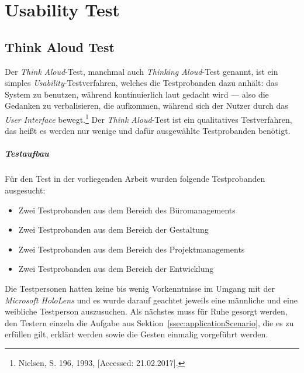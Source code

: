 \chapter{Usability Test}\label{chapter:UsabilityTest}
\section{Think Aloud Test}\label{sec:ThinkAloudTest} 
Der \textit{Think Aloud}-Test, manchmal auch \textit{Thinking Aloud}-Test genannt, ist ein simples \textit{Usability}-Testverfahren, welches die Testprobanden dazu anhält: \frqq das System zu benutzen, während kontinuierlich laut gedacht wird — also die Gedanken zu verbalisieren, die aufkommen, während sich der Nutzer durch das \textit{User Interface} bewegt.\flqq\footnote{Nielsen, S. 196, 1993, [Accessed: 21.02.2017].}
Der \textit{Think Aloud}-Test ist ein qualitatives Testverfahren, das heißt es werden nur wenige und dafür ausgewählte Testprobanden benötigt.
\paragraph*{Testaufbau}Für den Test in der vorliegenden Arbeit wurden folgende Testprobanden ausgesucht:\begin{itemize}
	\item Zwei Testprobanden aus dem Bereich des Büromanagements
	\item Zwei Testprobanden aus dem Bereich der Gestaltung
	\item Zwei Testprobanden aus dem Bereich des Projektmanagements
	\item Zwei Testprobanden aus dem Bereich der Entwicklung
\end{itemize}
Die Testpersonen hatten keine bis wenig Vorkenntnisse im Umgang mit der \textit{Microsoft HoloLens} und es wurde darauf geachtet jeweils eine männliche und eine weibliche Testperson auszusuchen.
Als nächstes muss für Ruhe gesorgt werden, den Testern einzeln die Aufgabe aus Sektion~\ref{ssec:applicationScenario}, die es zu erfüllen gilt, erklärt werden sowie die Gesten einmalig vorgeführt werden.

